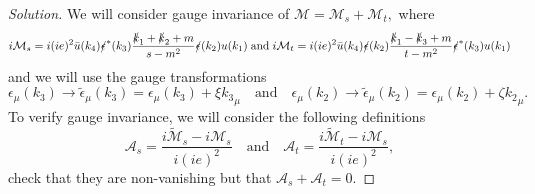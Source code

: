 \begin{proof}[Solution]
   We will consider gauge invariance of \(\mathcal{M} = \mathcal{M}_s + \mathcal{M}_t,\) where
   \begin{equation*}
      i\mathcal{M}_s = i(ie)^2 \bar{u}(k_4) \slashed{\epsilon}^*(k_3) \frac{\slashed{k}_1 + \slashed{k}_2 + m}{s - m^2} \slashed{\epsilon}(k_2) u(k_1)
      \;\text{and}\;
      i\mathcal{M}_t = i (i e)^2\bar{u}(k_4) \slashed{\epsilon}(k_2) \frac{\slashed{k}_1 - \slashed{k}_3 + m}{t - m^2} \slashed{\epsilon}^*(k_3) u(k_1)
   \end{equation*}
   and we will use the gauge transformations
   \begin{equation*}
      \epsilon_\mu(k_3) \to \tilde{\epsilon}_\mu(k_3) = \epsilon_\mu(k_3) + \xi {k_3}_\mu
      \quad\text{and}\quad
      \epsilon_\mu(k_2) \to \tilde{\epsilon}_\mu(k_2) = \epsilon_\mu(k_2) + \zeta {k_2}_\mu.
   \end{equation*}
   To verify gauge invariance, we will consider the following definitions
   \begin{equation*}
      \mathcal{A}_s = \frac{i\tilde{\mathcal{M}}_s - i\mathcal{M}_s}{i(ie)^2}
      \quad\text{and}\quad
      \mathcal{A}_t = \frac{i\tilde{\mathcal{M}}_t - i\mathcal{M}_s}{i(ie)^2},
   \end{equation*}
   check that they are non-vanishing but that \(\mathcal{A}_s + \mathcal{A}_t = 0.\) 


\end{proof}
